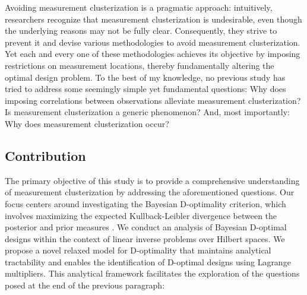 Avoiding measurement clusterization is a pragmatic approach:
intuitively, researchers recognize that measurement clusterization is
undesirable, even though the underlying reasons may not be fully
clear. Consequently, they strive to prevent it and devise various
methodologies to avoid measurement clusterization. Yet each and every
one of these methodologies achieves its objective by imposing
restrictions on measurement locations, thereby fundamentally altering
the optimal design problem. To the best of my knowledge, no previous
study has tried to address some seemingly simple yet fundamental
questions:
%
Why does imposing correlations between observations alleviate
measurement clusterization?
%
Is measurement clusterization a generic phenomenon?
%
And, most importantly: Why does measurement clusterization occur?
%
%


\subsection{Contribution}
The primary objective of this study is to provide a comprehensive
understanding of measurement clusterization by addressing the
aforementioned questions. Our focus centers around investigating the
Bayesian D-optimality criterion, which involves maximizing the
expected Kullback-Leibler divergence between the posterior and prior
measures \cite{CoverThomas91, Chaloner1995}. We conduct an analysis of
Bayesian D-optimal designs within the context of linear inverse
problems over Hilbert spaces. We propose a novel relaxed model for
D-optimality that maintains analytical tractability and enables the
identification of D-optimal designs using Lagrange multipliers. This
analytical framework facilitates the exploration of the questions
posed at the end of the previous paragraph:



